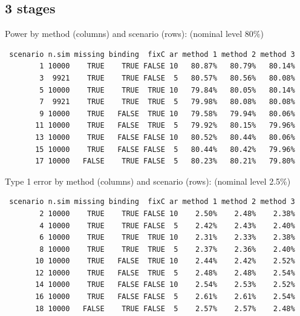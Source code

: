 \documentclass[12pt]{article}
\begin{document}
\clearpage

\subsection{3 stages}
\label{sec:org1223c05}

Power by method (columns) and scenario (rows): \hfill (nominal level 80\%)
\begin{verbatim}
 scenario n.sim missing binding  fixC ar method 1 method 2 method 3
        1 10000    TRUE    TRUE FALSE 10   80.87%   80.79%   80.14%
        3  9921    TRUE    TRUE FALSE  5   80.57%   80.56%   80.08%
        5 10000    TRUE    TRUE  TRUE 10   79.84%   80.05%   80.14%
        7  9921    TRUE    TRUE  TRUE  5   79.98%   80.08%   80.08%
        9 10000    TRUE   FALSE  TRUE 10   79.58%   79.94%   80.06%
       11 10000    TRUE   FALSE  TRUE  5   79.92%   80.15%   79.96%
       13 10000    TRUE   FALSE FALSE 10   80.52%   80.44%   80.06%
       15 10000    TRUE   FALSE FALSE  5   80.44%   80.42%   79.96%
       17 10000   FALSE    TRUE FALSE  5   80.23%   80.21%   79.80%
\end{verbatim}

\bigskip

Type 1 error by method (columns) and scenario (rows): \hfill (nominal level 2.5\%)
\begin{verbatim}
 scenario n.sim missing binding  fixC ar method 1 method 2 method 3
        2 10000    TRUE    TRUE FALSE 10    2.50%    2.48%    2.38%
        4 10000    TRUE    TRUE FALSE  5    2.42%    2.43%    2.40%
        6 10000    TRUE    TRUE  TRUE 10    2.31%    2.33%    2.38%
        8 10000    TRUE    TRUE  TRUE  5    2.37%    2.36%    2.40%
       10 10000    TRUE   FALSE  TRUE 10    2.44%    2.42%    2.52%
       12 10000    TRUE   FALSE  TRUE  5    2.48%    2.48%    2.54%
       14 10000    TRUE   FALSE FALSE 10    2.54%    2.53%    2.52%
       16 10000    TRUE   FALSE FALSE  5    2.61%    2.61%    2.54%
       18 10000   FALSE    TRUE FALSE  5    2.57%    2.57%    2.48%
\end{verbatim}

\clearpage
\end{document}
